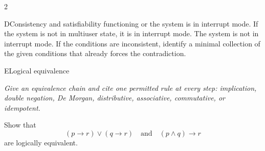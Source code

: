 \documentclass[9pt]{extarticle}
\begin{document}
\begin{multicols}{2}
\begin{CoreProblem}{D}{Consistency and satisfiability}
functioning or the system is in interrupt mode. If the system is not in
multiuser state, it is in interrupt mode. The system is not in interrupt mode.
If the conditions are inconsistent, identify a minimal collection of the given
conditions that already forces the contradiction.
\end{CoreProblem}
\begin{CoreProblem}{E}{Logical equivalence}
{\scriptsize\textit{Give an equivalence chain and cite one permitted rule at every step: implication, double negation, De Morgan, distributive, associative, commutative, or idempotent.}\par}
Show that
\[
  (p\to r)\lor(q\to r)
  \quad\text{and}\quad
  (p\land q)\to r
\]
are logically equivalent.
\end{CoreProblem}
\end{multicols}
\CoreWorkArea
\FormBreak
{}
\end{document}
